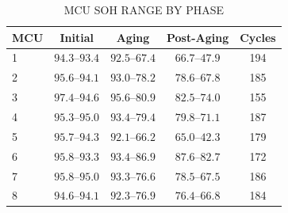 \begin{table}[H]
    \caption{MCU SOH RANGE BY PHASE}
    \label{tab:mcu_soh_summary}
    \begin{center}
        \footnotesize
        \begin{tabular}{lcccc}
            \hline
            \textbf{MCU} & \textbf{Initial} & \textbf{Aging} & \textbf{Post-Aging} & \textbf{Cycles} \\
            \hline
            1 & $94.3$--$93.4$ & $92.5$--$67.4$ & $66.7$--$47.9$ & 194 \\
            2 & $95.6$--$94.1$ & $93.0$--$78.2$ & $78.6$--$67.8$ & 185 \\
            3 & $97.4$--$94.6$ & $95.6$--$80.9$ & $82.5$--$74.0$ & 155 \\
            4 & $95.3$--$95.0$ & $93.4$--$79.4$ & $79.8$--$71.1$ & 187 \\
            5 & $95.7$--$94.3$ & $92.1$--$66.2$ & $65.0$--$42.3$ & 179 \\
            6 & $95.8$--$93.3$ & $93.4$--$86.9$ & $87.6$--$82.7$ & 172 \\
            7 & $95.8$--$95.0$ & $93.3$--$76.6$ & $78.5$--$67.5$ & 186 \\
            8 & $94.6$--$94.1$ & $92.3$--$76.9$ & $76.4$--$66.8$ & 184 \\
            \hline
        \end{tabular}
    \end{center}
\end{table}
